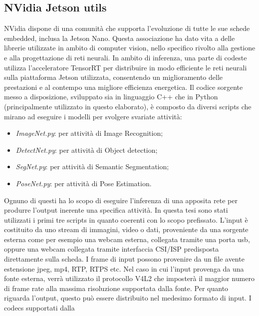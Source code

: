 \subsection{NVidia Jetson utils}\label{utils}
NVidia dispone di una comunità che supporta l'evoluzione di tutte le sue schede 
embedded, inclusa la Jetson Nano. Questa associazione ha dato vita 
a delle librerie utilizzate in ambito di computer vision, nello specifico rivolto 
alla gestione e alla  progettazione di reti neurali. In ambito di inferenza, una 
parte di codeste utilizza l'acceleratore TensorRT per distribuire in modo 
efficiente le reti neurali sulla piattaforma Jetson utilizzata, consentendo 
un miglioramento delle prestazioni e al contempo una migliore efficienza 
energetica. Il codice sorgente messo a disposizione, sviluppato sia in linguaggio 
C++ che in Python (principalmente utilizzato in questo elaborato), 
è composto da diversi scripts che mirano ad eseguire i modelli per svolgere 
svariate attività:
\begin{itemize}
    \item \emph{ImageNet.py}: per attività di Image Recognition;
    \item \emph{DetectNet.py}: per attività di Object detection;
    \item \emph{SegNet.py}: per attività di Semantic Segmentation;
    \item \emph{PoseNet.py}: per attività di Pose Estimation.
\end{itemize}
Ognuno di questi ha lo scopo di eseguire l'inferenza di una apposita rete 
per produrre l'output inerente una specifica attività. In questa tesi sono 
stati utilizzati i primi tre scripts in quanto coerenti con lo scopo prefissato. 
L'input è costituito da uno stream di immagini, video o dati, proveniente 
da una sorgente esterna come per esempio una webcam esterna, collegata 
tramite una porta usb, oppure una webcam collegata tramite interfaccia 
CSI/ISP predisposta direttamente sulla scheda. I frame di input possono 
provenire da un file avente estensione jpeg, mp4, RTP, RTPS etc. Nel caso 
in cui l'input provenga da una fonte esterna, verrà utilizzato il protocollo 
V4L2 che imposterà il maggior numero di frame rate alla massima risoluzione 
supportata dalla fonte. Per quanto riguarda l'output, questo può 
essere distribuito nel medesimo formato di input. I codecs supportati dalla 
